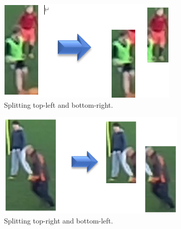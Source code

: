 \documentclass{article}
\begin{document}
\begin{figure}[h!]
  \begin{subfigure}[b]{\linewidth}
  \centering
    \includegraphics[scale=0.5]{report/pic/3/heuristic_1.PNG} 
    \caption{Splitting top-left and bottom-right.}
  \end{subfigure}
  \begin{subfigure}[b]{\linewidth}
  \centering
    \includegraphics[scale=0.5]{report/pic/3/heuristic_2.PNG} 
    \caption{Splitting top-right and bottom-left.}
  \end{subfigure}
  \caption{}
\end{figure}
\end{document}
